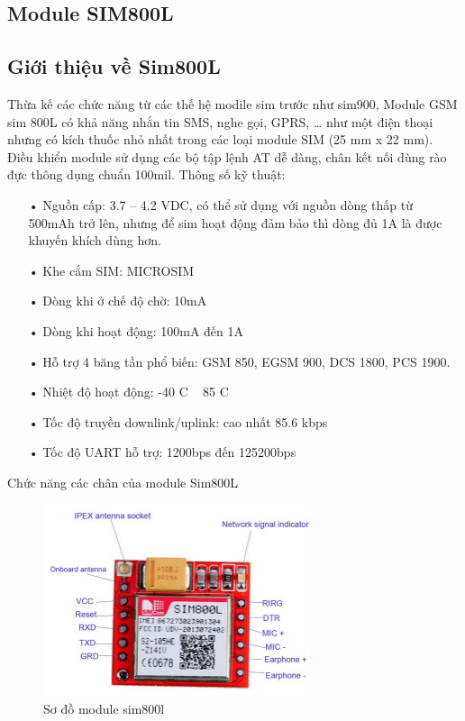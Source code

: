 \subsection{Module SIM800L}
\subsection*{Giới thiệu về Sim800L}
Thừa kế các chức năng từ các thế hệ modile sim trước như sim900, Module GSM sim 800L có khả năng nhắn tin SMS, nghe gọi, GPRS, … như một điện thoại nhưng có kích thuốc nhỏ nhất trong các loại module SIM (25 mm x 22 mm). Điều khiển module sử dụng các bộ tập lệnh AT dễ dàng, chân kết nối dùng rào đực thông dụng chuẩn 100mil.
Thông số kỹ thuật:
\begin{itemize}

\item[•]Nguồn cấp: 3.7 – 4.2 VDC, có thể sử dụng với nguồn dòng thấp từ 500mAh trở lên, nhưng để sim hoạt động đảm bảo thì dòng đủ 1A là được khuyến khích dùng hơn.
\item[•]Khe cắm SIM: MICROSIM
\item[•]Dòng khi ở chế độ chờ: 10mA
\item[•]Dòng khi hoạt động: 100mA đến 1A
\item[•]Hỗ trợ 4 băng tần phổ biến: GSM 850, EGSM 900, DCS 1800, PCS 1900.
\item[•]Nhiệt độ hoạt động: -40 C ~ 85 C
\item[•]Tốc độ truyền downlink/uplink: cao nhất 85.6 kbps
\item[•]Tốc độ UART hỗ trợ: 1200bps đến 125200bps
\end{itemize}

Chức năng các chân của module Sim800L
\begin{center}
\begin{figure}[htp]
\centering    
\includegraphics[width=0.7\textwidth]{sim800l}
\caption[Sơ đồ module sim800l]{Sơ đồ module sim800l}
\label{fig:sim800l}
\end{figure}
\end{center}	

